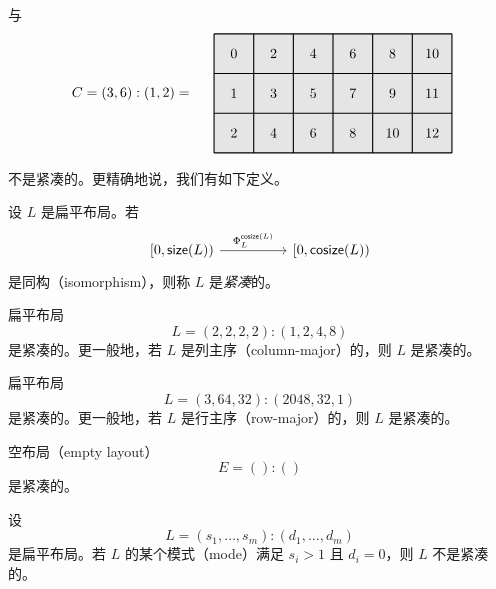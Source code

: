 与
\[
\begin{tikzpicture}[x={(0cm,-1cm)},y={(1cm,0cm)},every node/.style={minimum size=1cm, outer sep=0pt}]

\node[fill=gray!20] at (0,0) {0};
\node[fill=gray!20] at (0,1) {2};
\node[fill=gray!20] at (0,2) {4};
\node[fill=gray!20] at (0,3) {6};
\node[fill=gray!20] at (0,4) {8};
\node[fill=gray!20] at (0,5) {10};
\node[fill=gray!20] at (1,0) {1};
\node[fill=gray!20] at (1,1) {3};
\node[fill=gray!20] at (1,2) {5};
\node[fill=gray!20] at (1,3) {7};
\node[fill=gray!20] at (1,4) {9};
\node[fill=gray!20] at (1,5) {11};
\node[fill=gray!20] at (2,0) {2};
\node[fill=gray!20] at (2,1) {4};
\node[fill=gray!20] at (2,2) {6};
\node[fill=gray!20] at (2,3) {8};
\node[fill=gray!20] at (2,4) {10};
\node[fill=gray!20] at (2,5) {12};
\draw[color=black,thick,shift={(-0.5,-0.5)}] (0,0) grid (3,6);

\node[anchor = east] at (1,-1) {$C = (3,6):(1,2) = $};
\end{tikzpicture}
\]
不是紧凑的。更精确地说，我们有如下定义。

\begin{definition}\label{definitionofcompact}
    设 $L$ 是扁平布局。若
    \[\begin{tikzcd}
    {[}0,\size(L){)} \ar[rr,"\Phi_L^{\cosize(L)}"] & & {[}0,\cosize(L){)}
    \end{tikzcd} \]
    是同构（isomorphism），则称 $L$ 是{\it 紧凑}的。
\end{definition}

\begin{example}
    扁平布局
    \[
    L = (2,2,2,2):(1,2,4,8)
    \]
    是紧凑的。更一般地，若 $L$ 是列主序（column-major）的，则 $L$ 是紧凑的。
\end{example}

\begin{example}
    扁平布局
    \[
    L = (3,64,32):(2048,32,1)
    \]
    是紧凑的。更一般地，若 $L$ 是行主序（row-major）的，则 $L$ 是紧凑的。
\end{example}

\begin{example}
    空布局（empty layout）
    \[
    E = ():()
    \]
    是紧凑的。
\end{example}

\begin{example}
    设
    \[
    L = (s_1,\dots,s_m):(d_1,\dots,d_m)
    \]
    是扁平布局。若 $L$ 的某个模式（mode）满足 $s_i > 1$ 且 $d_i = 0$，则 $L$ 不是紧凑的。
\end{example}

